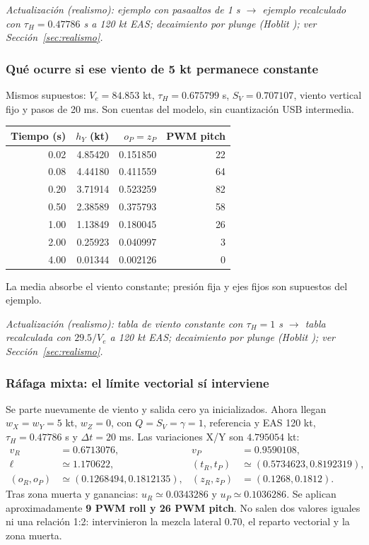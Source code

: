 \textit{Actualización (realismo): ejemplo con pasaaltos de 1 s $\rightarrow$ ejemplo recalculado con $\tau_H=0.47786$ s a 120 kt EAS; decaimiento por plunge (Hoblit \cite{hoblit1988}); ver Sección~\ref{sec:realismo}.}

\subsubsection{Qué ocurre si ese viento de 5 kt permanece constante}
Mismos supuestos: $V_e=84.853$ kt, $\tau_H=0.675799$ s, $S_V=0.707107$, viento vertical fijo y pasos de 20 ms. Son cuentas del modelo, sin cuantización USB intermedia.
\begin{center}\begin{tabular}{rrrr}
\toprule Tiempo (s)&$h_Y$ (kt)&$o_P=z_P$&PWM pitch\\\midrule
0.02&4.85420&0.151850&22\\
0.08&4.44180&0.411559&64\\
0.20&3.71914&0.523259&82\\
0.50&2.38589&0.375793&58\\
1.00&1.13849&0.180045&26\\
2.00&0.25923&0.040997&3\\
4.00&0.01344&0.002126&0\\
\bottomrule\end{tabular}\end{center}
La media absorbe el viento constante; presión fija y ejes fijos son supuestos del ejemplo.

\textit{Actualización (realismo): tabla de viento constante con $\tau_H=1$ s $\rightarrow$ tabla recalculada con $29.5/V_e$ a 120 kt EAS; decaimiento por plunge (Hoblit \cite{hoblit1988}); ver Sección~\ref{sec:realismo}.}

\subsubsection{Ráfaga mixta: el límite vectorial sí interviene}
Se parte nuevamente de viento y salida cero ya inicializados. Ahora llegan $w_X=w_Y=5$ kt, $w_Z=0$, con $Q=S_V=\gamma=1$, referencia y EAS 120 kt, $\tau_H=0.47786$ s y $\Delta t=20$ ms. Las variaciones X/Y son $4.795054$ kt:
\begin{align*}
v_R&=0.6713076,&v_P&=0.9590108,\\
\ell&\simeq1.170622,&(t_R,t_P)&\simeq(0.5734623,0.8192319),\\
(o_R,o_P)&\simeq(0.1268494,0.1812135),&
(z_R,z_P)&=(0.1268,0.1812).
\end{align*}
Tras zona muerta y ganancias: $u_R\simeq0.0343286$ y $u_P\simeq0.1036286$. Se aplican aproximadamente \textbf{9 PWM roll y 26 PWM pitch}. No salen dos valores iguales ni una relación 1:2: intervinieron la mezcla lateral 0.70, el reparto vectorial y la zona muerta.

